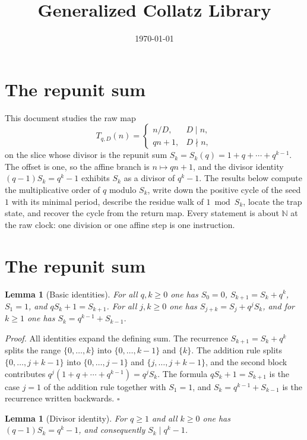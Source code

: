 \documentclass[11pt,letterpaper]{article}
\title{Generalized Collatz Library}
\author{}
\date{\today}
\newcommand{\N}{\mathbb{N}}
\newtheorem{lemma}[theorem]{Lemma}
\newenvironment{proof}{\noindent\textit{Proof.}}{\hfill\(\square\)}
\begin{document}
\maketitle
\section*{The repunit sum}

\noindent
This document studies the raw map
\[
T_{q,D}(n)=\begin{cases} n/D, & D\mid n,\\ qn+1, & D\nmid n,\end{cases}
\]
on the slice whose divisor is the repunit sum
\(S_k=S_k(q)=1+q+\cdots+q^{k-1}\). The offset is one, so the affine branch is
\(n\mapsto qn+1\), and the divisor identity \((q-1)S_k=q^k-1\) exhibits
\(S_k\) as a divisor of \(q^k-1\). The results below compute the
multiplicative order of \(q\) modulo \(S_k\), write down the positive cycle of
the seed \(1\) with its minimal period, describe the residue walk of
\(1\bmod S_k\), locate the trap state, and recover the cycle from the return
map. Every statement is about \(\N\) at the raw clock: one division or one
affine step is one instruction.

\section{The repunit sum}

\begin{lemma}[Basic identities]\label{Lem:RepunitBasic}
For all \(q,k\ge0\) one has \(S_0=0\), \(S_{k+1}=S_k+q^k\), \(S_1=1\), and
\(qS_k+1=S_{k+1}\). For all \(j,k\ge0\) one has
\(S_{j+k}=S_j+q^jS_k\), and for \(k\ge1\) one has
\(S_k=q^{k-1}+S_{k-1}\).
\end{lemma}

\begin{proof}
All identities expand the defining sum. The recurrence \(S_{k+1}=S_k+q^k\)
splits the range \(\{0,\dots,k\}\) into \(\{0,\dots,k-1\}\) and \(\{k\}\).
The addition rule splits \(\{0,\dots,j+k-1\}\) into \(\{0,\dots,j-1\}\) and
\(\{j,\dots,j+k-1\}\), and the second block contributes
\(q^j(1+q+\cdots+q^{k-1})=q^jS_k\). The formula \(qS_k+1=S_{k+1}\) is the
case \(j=1\) of the addition rule together with \(S_1=1\), and
\(S_k=q^{k-1}+S_{k-1}\) is the recurrence written backwards.
\end{proof}

\begin{lemma}[Divisor identity]\label{Lem:DivisorIdentity}
For \(q\ge1\) and all \(k\ge0\) one has \((q-1)S_k=q^k-1\), and consequently
\(S_k\mid q^k-1\).
\end{lemma}
\end{document}
